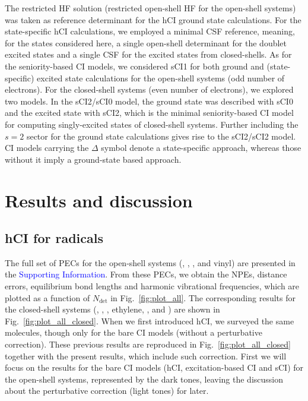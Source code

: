 \documentclass[aip,jcp,reprint,noshowkeys,superscriptaddress]{revtex4-1}
\newcommand{\SupInf}{\textcolor{blue}{Supporting Information}}
\newcommand{\Ndet}{N_\text{det}}
\begin{document}
The restricted HF solution (restricted open-shell HF for the open-shell systems) was taken as reference determinant for the hCI ground state calculations.
For the state-specific hCI calculations, we employed a minimal CSF reference, \cite{Kossoski_2023}
meaning, for the states considered here, a single open-shell determinant for the doublet excited states and a single CSF for the excited states from closed-shells.
As for the seniority-based CI models, 
we considered sCI1 for both ground and (state-specific) excited state calculations for the open-shell systems (odd number of electrons).
For the closed-shell systems (even number of electrons), we explored two models.
In the sCI2/sCI0 model, the ground state was described with sCI0 and the excited state with sCI2, which is the minimal seniority-based CI model for computing singly-excited states of closed-shell systems.
Further including the $s=2$ sector for the ground state calculations gives rise to the sCI2/sCI2 model.
CI models carrying the $\Delta$ symbol denote a state-specific approach, whereas those without it imply a ground-state based approach.


\section{Results and discussion}
\label{sec:res}


\subsection{hCI for radicals}
\label{sec:res_A}


The full set of PECs for the open-shell systems (, , , and vinyl) are presented in the {\SupInf}.
From these PECs, we obtain the NPEs, distance errors, equilibrium bond lengths and harmonic vibrational frequencies, which are plotted as a function of $\Ndet$ in Fig.~\ref{fig:plot_all}.
The corresponding results for the closed-shell systems (, , , ethylene, , and ) are shown in Fig.~\ref{fig:plot_all_closed}.
When we first introduced hCI, \cite{Kossoski_2022} we surveyed the same molecules, though only for the bare CI models (without a perturbative correction).
These previous results are reproduced in Fig.~\ref{fig:plot_all_closed} together with the present results, which include such correction.
First we will focus on the results for the bare CI models (hCI, excitation-based CI and sCI) for the open-shell systems, represented by the dark tones,
leaving the discussion about the perturbative correction (light tones) for later.
\end{document}
